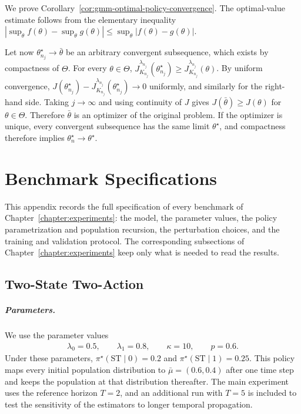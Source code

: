 We prove Corollary~\ref{cor:gmm-optimal-policy-convergence}.
The optimal-value estimate follows from the elementary inequality $\left| \sup_\theta f(\theta) - \sup_\theta g(\theta) \right| \leq \sup_\theta |f(\theta)-g(\theta)|$.

Let now $\theta_{n_j}^\star\to\bar\theta$ be an arbitrary convergent subsequence, which exists by compactness of $\Theta$. For every $\theta\in\Theta$, $J_{K_{n_j}}^{\lambda_{n_j}} (\theta_{n_j}^\star) \geq J_{K_{n_j}}^{\lambda_{n_j}} (\theta)$. By uniform convergence, $J(\theta_{n_j}^\star) - J_{K_{n_j}}^{\lambda_{n_j}} (\theta_{n_j}^\star) \longrightarrow0$ uniformly, and similarly for the right-hand side. Taking $j\to\infty$ and using continuity of $J$ gives $J(\bar\theta)\geq J(\theta)$ for $\theta\in\Theta$. Therefore $\bar\theta$ is an optimizer of the original problem. If the optimizer is unique, every convergent subsequence has the same limit $\theta^\star$, and compactness therefore implies $\theta_n^\star\to\theta^\star$.


\chapter{Benchmark Specifications}
\label{appendix:benchmark-specs}

This appendix records the full specification of every benchmark of Chapter~\ref{chapter:experiments}: the model, the parameter values, the policy parametrization and population recursion, the perturbation choices, and the training and validation protocol. The corresponding subsections of Chapter~\ref{chapter:experiments} keep only what is needed to read the results.

\section{Two-State Two-Action}
\label{appendix:spec-twostate}

\paragraph{Parameters.}
We use the parameter values
\begin{align}
    \lambda_0=0.5,
    \qquad
    \lambda_1=0.8,
    \qquad
    \kappa=10,
    \qquad
    p=0.6.
\end{align}
Under these parameters, $\pi^\star(\mathrm{ST}\mid 0)=0.2$ and $\pi^\star(\mathrm{ST}\mid 1)=0.25$. This policy maps every initial population distribution to $\bar\mu =(0.6,0.4)$ after one time step and keeps the population at that distribution thereafter. The main experiment uses the reference horizon $T=2$, and an additional run with $T=5$ is included to test the sensitivity of the estimators to longer temporal propagation.

